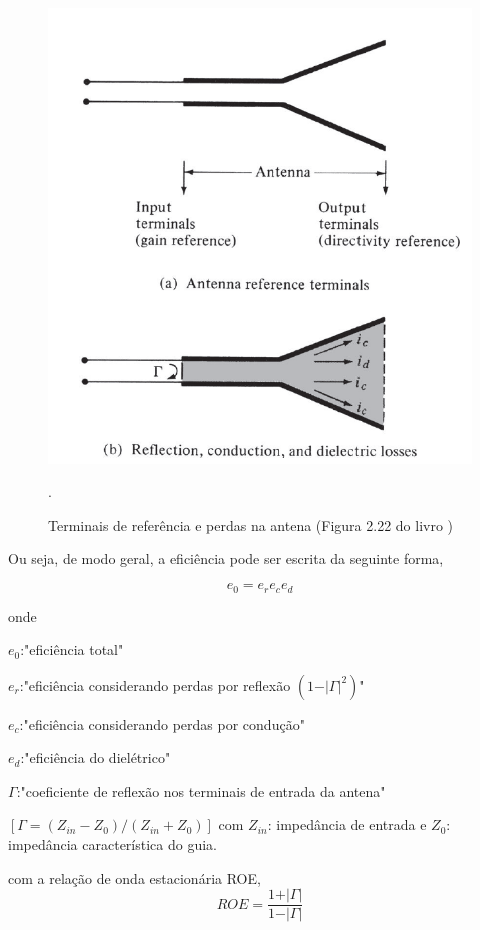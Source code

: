 \begin{figure}[h]
\centering
\includegraphics[scale=0.6]{chapters/ch3/assets/perdas_antena}
\caption[Terminais de referência e perdas na antena]{Terminais de referência e perdas na antena (Figura 2.22 do livro \cite{Balanis2016})}. 
\label{fig:perdas_antena}
\end{figure}

Ou seja, de modo geral, a eficiência pode ser escrita da seguinte forma,

\begin{equation} \label{3.20}
e_{0}=e_{r}e_{c}e_{d}
\end{equation}

onde \par 
$e_{0}$:"eficiência total" \par
$e_{r}$:"eficiência considerando perdas por reflexão $\left( 1-\vert\Gamma\vert^{2}\right)$"\par
$e_{c}$:"eficiência considerando perdas por condução"\par
$e_{d}$:"eficiência do dielétrico"\par
$\Gamma$:"coeficiente de reflexão nos terminais de entrada da antena"\par 
$\left[ \Gamma=(Z_{in}-Z_{0})/(Z_{in}+Z_{0})\right] $ com $ Z_{in}$: impedância de entrada e $Z_{0}$: impedância característica do guia.\par 
com a relação de onda estacionária ROE,
\begin{equation} \label{3.21}
ROE=\dfrac{1+\vert\Gamma\vert}{1-\vert\Gamma\vert}
\end{equation}

